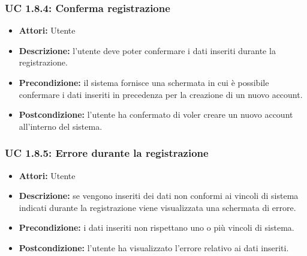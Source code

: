\subsubsection{UC 1.8.4: Conferma registrazione}

\begin{itemize}
    \item \textbf{Attori:} Utente
    \item \textbf{Descrizione:} l'utente deve poter confermare i dati inseriti durante la registrazione.
    \item \textbf{Precondizione:} il sistema fornisce una schermata in cui è possibile confermare i dati inseriti in precedenza per la creazione di un nuovo account.
    \item \textbf{Postcondizione:} l'utente ha confermato di voler creare un nuovo account all'interno
    del sistema.
\end{itemize}

\subsubsection{UC 1.8.5: Errore durante la registrazione}

\begin{itemize}
    \item \textbf{Attori:} Utente
    \item \textbf{Descrizione:} se vengono inseriti dei dati non conformi ai vincoli di sistema indicati durante la registrazione viene visualizzata una schermata di errore.
    \item \textbf{Precondizione:} i dati inseriti non rispettano uno o più vincoli di sistema.
    \item \textbf{Postcondizione:} l'utente ha visualizzato l'errore relativo ai dati inseriti.
\end{itemize}
